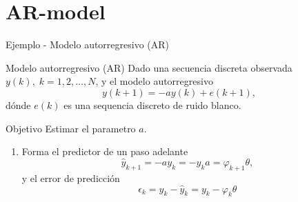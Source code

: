 \documentclass[presentation,aspectratio=169]{beamer}
\begin{document}
\section{AR-model}
\label{sec:org70d556b}

\begin{frame}[label={sec:org54d7c16}]{Ejemplo - Modelo autorregresivo (AR)}
\end{frame}
\begin{frame}[label={sec:org37acf87}]{Modelo autorregresivo (AR)}
Dado una secuencia discreta observada \(y(k), \; k=1,2,\ldots,N\), y el modelo autorregresivo
\[ y(k+1) = -ay(k) + e(k+1),\]
dónde \(e(k)\) es una sequencia discreto de ruido blanco.

\alert{Objetivo} Estimar el parametro \(a\).

\begin{enumerate}
\item Forma el predictor de un paso adelante \[\hat{y}_{k+1} = -ay_k=-y_ka = \varphi_{k+1} \theta,\] y el error de predicción \[\epsilon_k = y_k - \hat{y}_k = y_k - \varphi_k \theta\]
\end{enumerate}
\end{frame}
\end{document}
